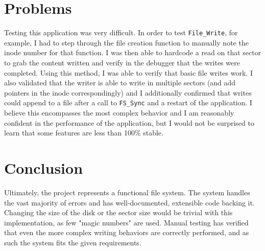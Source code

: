 \documentclass[]{article}
\begin{document}
\section{Problems} \label{sec:problems}
Testing this application was very difficult. In order to test \texttt{File\_Write}, for example, I had to step through the file creation function to manually note the inode number for that function. I was then able to hardcode a read on that sector to grab the content written and verify in the debugger that the writes were completed. Using this method, I was able to verify that basic file writes work. I also validated that the writer is able to write in multiple sectors (and add pointers in the inode correspondingly) and I additionally confirmed that writes could append to a file after a call to \texttt{FS\_Sync} and a restart of the application. I believe this encompasses the most complex behavior and I am reasonably confident in the performance of the application, but I would not be surprised to learn that some features are less than 100\% stable.

\section{Conclusion}
Ultimately, the project represents a functional file system. The system handles the vast majority of errors and has well-documented, extensible code backing it. Changing the size of the disk or the sector size would be trivial with this implementation, as few "magic numbers" are used. Manual testing has verified that even the more complex writing behaviors are correctly performed, and as such the system fits the given requirements.
\end{document}
